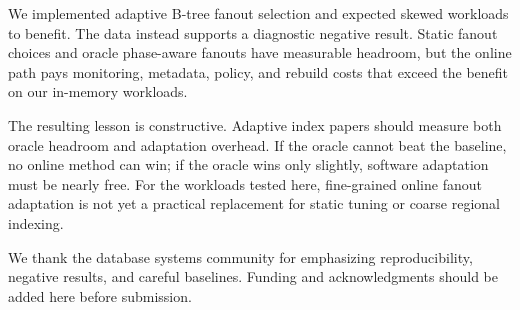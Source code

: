 \documentclass[sigconf,screen]{acmart}
\begin{document}
We implemented adaptive B-tree fanout selection and expected skewed workloads
to benefit.  The data instead supports a diagnostic negative result.  Static
fanout choices and oracle phase-aware fanouts have measurable headroom, but the
online path pays monitoring, metadata, policy, and rebuild costs that exceed
the benefit on our in-memory workloads.

The resulting lesson is constructive.  Adaptive index papers should measure
both oracle headroom and adaptation overhead.  If the oracle cannot beat the
baseline, no online method can win; if the oracle wins only slightly, software
adaptation must be nearly free.  For the workloads tested here, fine-grained
online fanout adaptation is not yet a practical replacement for static tuning
or coarse regional indexing.

\begin{acks}
We thank the database systems community for emphasizing reproducibility,
negative results, and careful baselines.  Funding and acknowledgments should be
added here before submission.
\end{acks}



\end{document}
